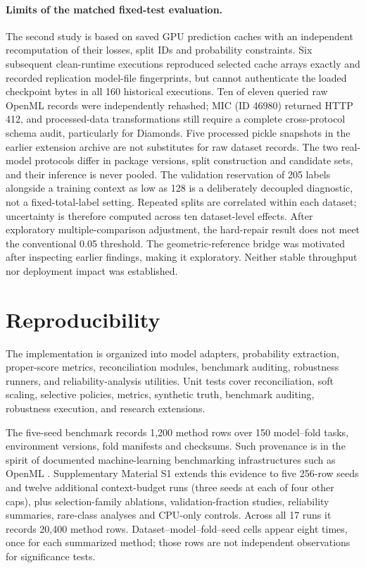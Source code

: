 \documentclass[a4paper,fleqn]{cas-sc}
\begin{document}
\paragraph{Limits of the matched fixed-test evaluation.}
The second study is based on saved GPU prediction caches with an independent recomputation of their losses, split IDs and probability constraints. Six subsequent clean-runtime executions reproduced selected cache arrays exactly and recorded replication model-file fingerprints, but cannot authenticate the loaded checkpoint bytes in all 160 historical executions. Ten of eleven queried raw OpenML records were independently rehashed; MIC (ID 46980) returned HTTP 412, and processed-data transformations still require a complete cross-protocol schema audit, particularly for Diamonds. Five processed pickle snapshots in the earlier extension archive are not substitutes for raw dataset records. The two real-model protocols differ in package versions, split construction and candidate sets, and their inference is never pooled. The validation reservation of 205 labels alongside a training context as low as 128 is a deliberately decoupled diagnostic, not a fixed-total-label setting. Repeated splits are correlated within each dataset; uncertainty is therefore computed across ten dataset-level effects. After exploratory multiple-comparison adjustment, the hard-repair result does not meet the conventional 0.05 threshold. The geometric-reference bridge was motivated after inspecting earlier findings, making it exploratory. Neither stable throughput nor deployment impact was established.

\section{Reproducibility}
The implementation is organized into model adapters, probability extraction, proper-score metrics, reconciliation modules, benchmark auditing, robustness runners, and reliability-analysis utilities. Unit tests cover reconciliation, soft scaling, selective policies, metrics, synthetic truth, benchmark auditing, robustness execution, and research extensions.

The five-seed benchmark records 1,200 method rows over 150 model--fold tasks, environment versions, fold manifests and checksums. Such provenance is in the spirit of documented machine-learning benchmarking infrastructures such as OpenML \citep{vanschoren2014openml}. Supplementary Material S1 extends this evidence to five 256-row seeds and twelve additional context-budget runs (three seeds at each of four other caps), plus selection-family ablations, validation-fraction studies, reliability summaries, rare-class analyses and CPU-only controls. Across all 17 runs it records 20,400 method rows. Dataset--model--fold--seed cells appear eight times, once for each summarized method; those rows are not independent observations for significance tests.
\end{document}

